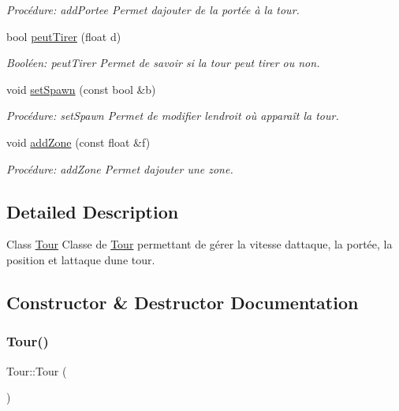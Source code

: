 \begin{DoxyCompactItemize}
\begin{DoxyCompactList}\small\item\em Procédure\+: add\+Portee Permet d\textquotesingle{}ajouter de la portée à la tour. \end{DoxyCompactList}\item 
bool \hyperlink{classTour_ad5f5b265668dfa44b23e48a1dbf1e322}{peut\+Tirer} (float d)
\begin{DoxyCompactList}\small\item\em Booléen\+: peut\+Tirer Permet de savoir si la tour peut tirer ou non. \end{DoxyCompactList}\item 
void \hyperlink{classTour_a896b0ab5f8a022d7deb6d599de8d4642}{set\+Spawn} (const bool \&b)
\begin{DoxyCompactList}\small\item\em Procédure\+: set\+Spawn Permet de modifier l\textquotesingle{}endroit où apparaît la tour. \end{DoxyCompactList}\item 
void \hyperlink{classTour_a6c3050640d16281913269f73af884ad6}{add\+Zone} (const float \&f)
\begin{DoxyCompactList}\small\item\em Procédure\+: add\+Zone Permet d\textquotesingle{}ajouter une zone. \end{DoxyCompactList}\end{DoxyCompactItemize}


\subsection{Detailed Description}
Class \hyperlink{classTour}{Tour} Classe de \hyperlink{classTour}{Tour} permettant de gérer la vitesse d\textquotesingle{}attaque, la portée, la position et l\textquotesingle{}attaque d\textquotesingle{}une tour. 

\subsection{Constructor \& Destructor Documentation}
\mbox{\label{classTour_a85e0f0e2346d1e42a09a80c1cd6d19c4}} 
\subsubsection{\texorpdfstring{Tour()}{Tour()}\hspace{0.1cm}{\footnotesize\ttfamily [1/3]}}
{\footnotesize\ttfamily Tour\+::\+Tour (\begin{DoxyParamCaption}{ }\end{DoxyParamCaption})}



